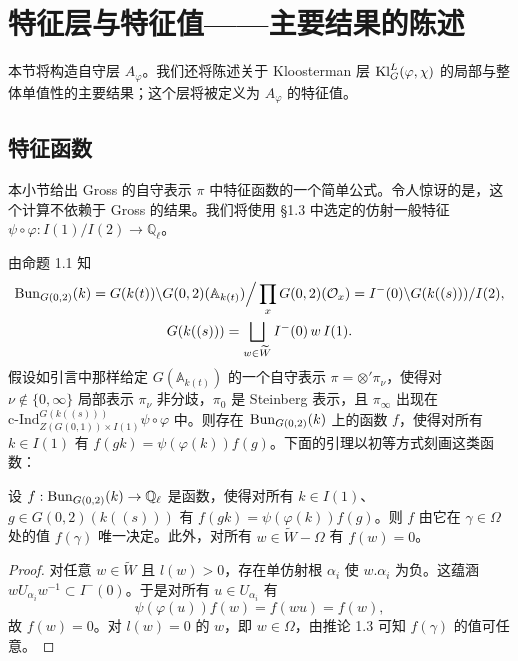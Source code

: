 
\section{特征层与特征值——主要结果的陈述}

本节将构造自守层 $A_\varphi$。我们还将陈述关于 Kloosterman 层 $\mathrm{Kl}^{L}_G(\varphi,\chi)$ 的局部与整体单值性的主要结果；这个层将被定义为 $A_\varphi$ 的特征值。

\subsection{特征函数}

本小节给出 Gross 的自守表示 $\pi$ 中特征函数的一个简单公式。令人惊讶的是，这个计算不依赖于 Gross 的结果。我们将使用 §1.3 中选定的仿射一般特征 $\psi\circ\varphi:I(1)/I(2)\to\mathbb{Q}_\ell$。

由命题 1.1 知
\begin{gather*}
\mathrm{Bun}_{G(0,2)}(k)=G(k(t))\backslash G(0,2)(\mathbb{A}_{k(t)})\Big/\prod_x G(0,2)(\mathcal O_x)
=I^-(0)\backslash G(k((s)))/I(2),\\
G(k((s)))=\bigsqcup_{w\in\widetilde W}I^-(0)\,w\,I(1).
\end{gather*}
假设如引言中那样给定 $G(\mathbb{A}_{k(t)})$ 的一个自守表示 $\pi=\otimes'\pi_\nu$，使得对 $\nu\notin\{0,\infty\}$ 局部表示 $\pi_\nu$ 非分歧，$\pi_0$ 是 Steinberg 表示，且 $\pi_\infty$ 出现在 $\mathrm{c\text{-}Ind}_{Z(G(0,1))\times I(1)}^{G(k((s)))}\psi\circ\varphi$ 中。则存在 $\mathrm{Bun}_{G(0,2)}(k)$ 上的函数 $f$，使得对所有 $k\in I(1)$ 有 $f(gk)=\psi(\varphi(k))f(g)$。下面的引理以初等方式刻画这类函数：

\begin{lemma}
设 $f:\mathrm{Bun}_{G(0,2)}(k)\to\mathbb{Q}_\ell$ 是函数，使得对所有 $k\in I(1)$、$g\in G(0,2)(k((s)))$ 有 $f(gk)=\psi(\varphi(k))f(g)$。则 $f$ 由它在 $\gamma\in\Omega$ 处的值 $f(\gamma)$ 唯一决定。此外，对所有 $w\in\widetilde W-\Omega$ 有 $f(w)=0$。
\end{lemma}

\begin{proof}
对任意 $w\in\widetilde W$ 且 $l(w)>0$，存在单仿射根 $\alpha_i$ 使 $w.\alpha_i$ 为负。这蕴涵 $wU_{\alpha_i}w^{-1}\subset I^-(0)$。于是对所有 $u\in U_{\alpha_i}$ 有
\[
\psi(\varphi(u))f(w)=f(wu)=f(w),
\]
故 $f(w)=0$。对 $l(w)=0$ 的 $w$，即 $w\in\Omega$，由推论 1.3 可知 $f(\gamma)$ 的值可任意。
\end{proof}

